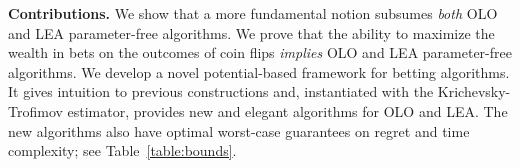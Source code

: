 
\textbf{Contributions.} We show that a more fundamental notion subsumes
\emph{both} \ac{OLO} and \ac{LEA} parameter-free algorithms. We prove that the
ability to maximize the wealth in bets on the outcomes of coin flips
\emph{implies} \ac{OLO} and \ac{LEA} parameter-free algorithms. We develop a
novel potential-based framework for betting algorithms. It gives intuition to previous constructions and, instantiated
with the Krichevsky-Trofimov estimator, provides new and elegant algorithms for \ac{OLO}
and \ac{LEA}.  The new algorithms also have optimal worst-case
guarantees on regret and time complexity; see Table~\ref{table:bounds}.
